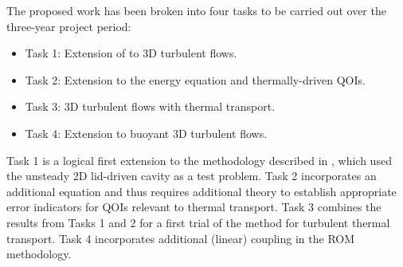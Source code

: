{The proposed work has been broken into four tasks to be carried
out over the three-year project period: \\[-4.0ex]
\begin{itemize}
\item Task 1:  Extension of \cite{fick18} to 3D turbulent flows.
\\[-4.3ex]
\item Task 2:  Extension to the energy equation and thermally-driven QOIs.
\\[-4.3ex]
\item Task 3:  3D turbulent flows with thermal transport.
\\[-4.3ex]
\item Task 4:  Extension to buoyant 3D turbulent flows.
\end{itemize}
Task 1 is a logical first extension to the methodology described in \cite{fick18},
which used the unsteady 2D lid-driven cavity as a test problem.  
Task 2 incorporates an additional equation and thus requires additional
theory to establish appropriate error indicators for QOIs relevant to thermal
transport.
Task 3 combines the results from Tasks 1 and 2 for a first trial of
the method for turbulent thermal transport.
Task 4 incorporates additional (linear) coupling in the ROM methodology.

}
